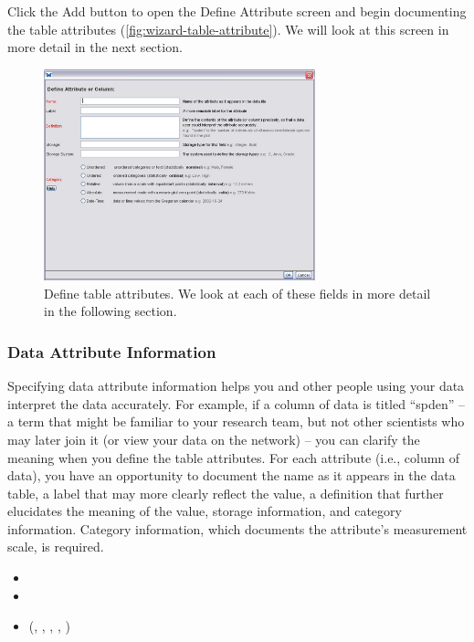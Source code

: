 Click the Add button to open the Define Attribute screen and begin
documenting the table attributes (\autoref{fig:wizard-table-attribute}). We will look at this
screen in more detail in the next section.

\begin{figure}
  \centering
    \includegraphics[width=0.7\textwidth]{images/wizard-table-attribute.jpg}
  \caption{Define table attributes. We look at each of these fields in
    more detail in the following section.}
  \label{fig:wizard-table-attribute}
\end{figure}

\subsubsection{Data Attribute Information} \label{sec:table-attribute-info}

Specifying data attribute information helps you and other people using
your data interpret the data accurately. For example, if a column of
data is titled ``spden'' -- a term that might be familiar to your
research team, but not other scientists who may later join it (or view
your data on the network) -- you can clarify the meaning when you define
the table attributes. For each attribute (i.e., column of data), you
have an opportunity to document the name as it appears in the data
table, a label that may more clearly reflect the value, a definition
that further elucidates the meaning of the value, storage information,
and category information. Category information, which documents the
attribute's measurement scale, is required.

\begin{itemize}
  \setlength{\parskip}{1pt}
  \item {}
  \item {}
  \item {} (,
    , ,
    , )
\end{itemize}

